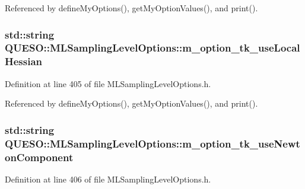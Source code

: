 Referenced by define\-My\-Options(), get\-My\-Option\-Values(), and print().

\hypertarget{class_q_u_e_s_o_1_1_m_l_sampling_level_options_a341b15acf7986499350294276d25954a}{
\subsubsection[{m\-\_\-option\-\_\-tk\-\_\-use\-Local\-Hessian}]{\setlength{\rightskip}{0pt plus 5cm}std\-::string Q\-U\-E\-S\-O\-::\-M\-L\-Sampling\-Level\-Options\-::m\-\_\-option\-\_\-tk\-\_\-use\-Local\-Hessian\hspace{0.3cm}{\ttfamily [private]}}}\label{class_q_u_e_s_o_1_1_m_l_sampling_level_options_a341b15acf7986499350294276d25954a}


Definition at line 405 of file M\-L\-Sampling\-Level\-Options.\-h.



Referenced by define\-My\-Options(), get\-My\-Option\-Values(), and print().

\hypertarget{class_q_u_e_s_o_1_1_m_l_sampling_level_options_a875164924a6fe4ccf52d66db10c272a8}{
\subsubsection[{m\-\_\-option\-\_\-tk\-\_\-use\-Newton\-Component}]{\setlength{\rightskip}{0pt plus 5cm}std\-::string Q\-U\-E\-S\-O\-::\-M\-L\-Sampling\-Level\-Options\-::m\-\_\-option\-\_\-tk\-\_\-use\-Newton\-Component\hspace{0.3cm}{\ttfamily [private]}}}\label{class_q_u_e_s_o_1_1_m_l_sampling_level_options_a875164924a6fe4ccf52d66db10c272a8}


Definition at line 406 of file M\-L\-Sampling\-Level\-Options.\-h.




